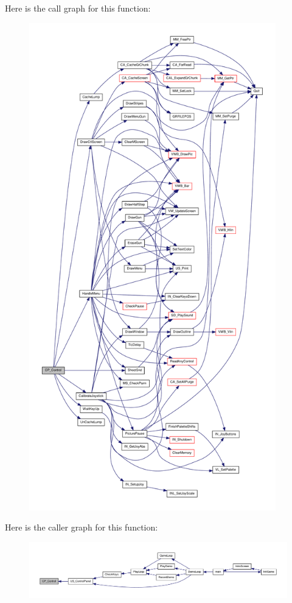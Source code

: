 Here is the call graph for this function:
\nopagebreak
\begin{figure}[H]
\begin{center}
\leavevmode
\includegraphics[height=600pt]{WL__MENU_8C_a8d89e45be2c67ed682acb9ee0c09cd75_cgraph}
\end{center}
\end{figure}




Here is the caller graph for this function:
\nopagebreak
\begin{figure}[H]
\begin{center}
\leavevmode
\includegraphics[width=400pt]{WL__MENU_8C_a8d89e45be2c67ed682acb9ee0c09cd75_icgraph}
\end{center}
\end{figure}


